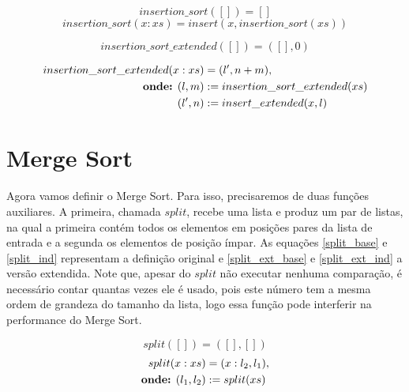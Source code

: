 \documentclass[12pt, oneside, a4paper,english,brazil]{abntex2}
\begin{document}
\begin{equation} \label{ins_sort_base}
insertion\_sort([]) = []
\end{equation}
\begin{equation} \label{ins_sort_ind}
insertion\_sort(x : xs) = insert(x, insertion\_sort(xs))
\end{equation}

\begin{equation} \label{ins_sort_ext_base}
insertion\_sort\_extended([]) = ([], 0)
\end{equation}


\begin{equation}\label{ins_sort_ext_ind}
\begin{split}
  insertion\_sort\_extended(x : xs) &= (l', n + m),\\
  \text{\textbf{onde:} }(l, m) &:= insertion\_sort\_extended(xs)\\
  \text{\quad} (l', n) &:= insert\_extended(x, l)
\end{split}
\end{equation}

\section{Merge Sort}
\qquad Agora vamos definir o Merge Sort. Para isso, precisaremos de duas fun\c{c}\~oes
auxiliares. A primeira, chamada $split$, recebe uma lista e produz um par de listas,
na qual a primeira cont\'em todos os elementos em posi\c{c}\~oes pares da lista de entrada
e a segunda os elementos de posi\c{c}\~ao \'impar. As equa\c{c}\~oes \ref{split_base} e \ref{split_ind}
representam a defini\c{c}\~ao original e \ref{split_ext_base} e \ref{split_ext_ind} a vers\~ao extendida.
Note que, apesar do $split$ n\~ao executar nenhuma compara\c{c}\~ao, \'e necess\'ario contar quantas vezes
ele \'e usado, pois este n\'umero tem a mesma ordem de grandeza do tamanho da lista, logo essa fun\c{c}\~ao
pode interferir na performance do Merge Sort.

\begin{equation}\label{split_base}
split([]) = ([], [])
\end{equation}
\begin{equation}
\begin{split}\label{split_ind}
  split(x : xs) &= (x : l_{2}, l_{1}),\\
  \text{\textbf{onde:} } (l_{1}, l_{2}) &:= split(xs)
\end{split}
\end{equation}
\end{document}
